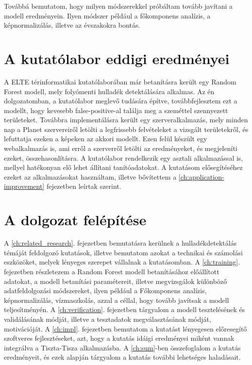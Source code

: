 Továbbá bemutatom, hogy milyen módszerekkel próbáltam tovább javítani a modell eredményein. Ilyen módszer például a főkomponens analízis, a képnormalizálás, illetve az évszakokra bontás.

\section{A kutatólabor eddigi eredményei}

A ELTE térinformatikai kutatólaborában már betanításra került egy Random Forest modell, mely folyómenti hulladék detektálására alkalmas. Az én dolgozatomban, a kutatólabor meglevő tudására építve, továbbfejlesztem ezt a modellt, hogy kevesebb false-positive-al találja meg a szeméttel szennyezett területeket. Továbbra implementálásra került egy szerveralkalmazás, mely minden nap a Planet szervereiről letölti a legfrissebb felvételeket a vizsgált területekről, és lefuttatja ezeken a képeken az akkori modellt. Ezen felül készült egy webalkalmazás is, ami erről a szerverről letölti az eredményeket, és megjeleníti ezeket, összehasonlításra. A kutatólabor rendelkezik egy asztali alkalmazással is, mellyel hatékonyan elő lehet állítani tanítóadatokat. A kutatásom elősegítéséhez ezeket az alkalmazásokat használtam, illetve bővítettem a \ref{ch:application-improvement} fejezetben leírtak szerint.

\section{A dolgozat felépítése}
A \ref{ch:related_research}. fejezetben bemutatásra kerülnek a hulladékdetektálás témáját feldolgozó kutatások, illetve bemutatom azokat a technikai és számolási eszközöket, melyek lényeges szerepet vállalnak a kutatásomban.
A \ref{ch:training}. fejezetben részletezem a Random Forest modell betanításához előállított adatokat, a modell betanítási paramétereit, illetve megvizsgálok különböző adatfeldolgozási módszereket, ilyen például a Főkomponens analízis, képnormalizálás, vízmaszkolás, azzal a céllal, hogy tovább javítsak a modell teljesítményén. A \ref{ch:verification}. fejezetben tárgyalom a modell tesztelésének és validálásának módját, illetve a tesztadatok megválasztásának módját, motivációját. A \ref{ch:impl}. fejezetben bemutatom a kutatást lényegesen előresegítő szoftveres fejlesztéseket, azt, hogy a kutatás idáigi eredményei miként vannak integrálva a Tiszta-Tisza alkalmazásba. A \ref{ch:sum}-ben összefoglalom a kutatás eredményeit, és ezek alapján tárgyalom a kutatás további lehetséges haladásait. 